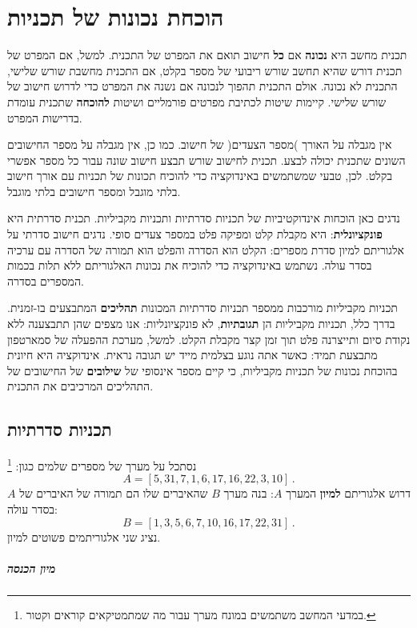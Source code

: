 
\chapter{%
הוכחת נכונות של תכניות%
}\label{s.verif}

תכנית מחשב היא
\textbf{נכונה}
אם
\textbf{כל}
חישוב תואם את המפרט של התכנית. למשל, אם המפרט של תכנית דורש שהיא תחשב שורש ריבועי של מספר בקלט, אם התכנית מחשבת שורש שלישי, התכנית לא נכונה. אולם התכנית תהפוך לנכונה אם נשנה את המפרט כדי לדרוש חישוב של שורש שלישי. קיימות שיטות לכתיבת מפרטים פורמליים ושיטות
\textbf{להוכחה}
שתכנית עומדת בדרישות המפרט.

אין מגבלה על האורך )מספר הצעדים( של חישוב. כמו כן, אין מגבלה על מספר החישובים השונים שתכנית יכולה לבצע. תכנית לחישוב שורש תבצע חישוב שונה עבור כל מספר אפשרי בקלט. לכן, טבעי שמשתמשים באינדוקציה כדי להוכיח תכונות של תכניות עם אורך חישוב בלתי מוגבל ומספר חישובים בלתי מוגבל.

נדגים כאן הוכחות אינדוקטיביות של תכניות סדרתיות ותכניות מקביליות. תכנית סדרתית היא
\textbf{פונקציונלית}:
היא מקבלת קלט ומפיקה פלט במספר צעדים סופי. נדגים חישוב סדרתי על אלגוריתם למיון סדרת מספרים: הקלט הוא הסדרה והפלט הוא תמורה של הסדרה עם ערכיה בסדר עולה. נשתמש באינדוקציה כדי להוכיח את נכונות האלגוריתם ללא תלות בכמות המספרים בסדרה.

תכניות מקביליות מורכבות ממספר תכניות סדרתיות המכונות
\textbf{תהליכים}
המתבצעים בו-זמנית. בדרך כלל, תכניות מקביליות הן
\textbf{תגובתיות},
לא פונקציונליות: אנו מצפים שהן תתבצענה ללא נקודת סיום ותייצרנה פלט תוך זמן קצר מקבלת הקלט. למשל, מערכת ההפעלה של סמארטפון מתבצעת תמיד: כאשר אתה נוגע בצלמית מייד יש תגובה נראית. אינדוקציה היא חיונית בהוכחת נכונות של תכניות מקביליות, כי קיים מספר אינסופי של
\textbf{שילובים}
של החישובים של התהליכים המרכיבים את התכנית.

\section{%
תכניות סדרתיות%
}

נסתכל על מערך של מספרים שלמים כגון:%
\footnote{%
במדעי המחשב משתמשים במונח מערך עבור מה שמתמטיקאים קוראים וקטור.%
}
\[
A=[5,31,7,1,6,17,16,22,3,10]\,.
\]
דרוש אלגוריתם
\textbf{למיון}
המערך
$A$:
בנה מערך
$B$
שהאיברים שלו הם תמורה של האיברים של
$A$
בסדר עולה:
\[
B=[1,3,5,6,7,10,16,17,22,31]\,.
\]
נציג שני אלגוריתמים פשוטים למיון.
\paragraph{%
מיון הכנסה%
}

